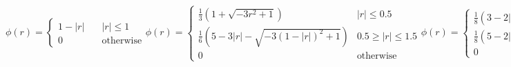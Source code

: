 \begin{subequations}\label{eq:C3_phiFunction}
\begin{equation}\label{eq:C3_phiFunction_2point}
	\phi(r) = 
	\begin{cases}
	1 - |r| \quad &|r| \leq 1 \\
	0	\quad &\text{otherwise}
	\end{cases}
\end{equation}
\begin{equation}\label{eq:C3_phiFunction_3point}
	\phi(r) = 
	\begin{cases}
		\frac{1}{3} \left( 1 + \sqrt{-3r^2 + 1} \right) \quad &|r| \leq 0.5 \\
		\frac{1}{6} \left( 5 - 3|r| - \sqrt{-3(1 - |r|)^2 + 1} \right) & 0.5 \geq |r| \leq 1.5 \\
		0 & \text{otherwise}
	\end{cases}
\end{equation}
\begin{equation}\label{eq:C3_phiFunction_4point}
	\phi(r) = 
	\begin{cases}
		\frac{1}{8}
		\left(
		3 - 2|r| + \sqrt{1 + 4|r| - 4r^2}
		\right) \quad &0 \leq |r| \leq 1
		\\
		\frac{1}{8}
		\left(
		5 - 2|r| + \sqrt{-7 + 12|r| - 4r^2}
		\right) \quad &1 \leq |r| \leq 2
		\\
		0 &\text{otherwise}
	\end{cases}
\end{equation}
\begin{equation}\label{eq:C3_phiFunction_6point}
	\phi(r) = 
	\begin{cases}
		\begin{split}
		\frac{61}{112} - \frac{11}{42} |r| - \frac{11}{56} |r|^2 + \frac{1}{12} |r|^3 + 
		\frac{\sqrt{3}}{336}
		\left( 243 + 1584 |r| \right. \\
		\left. - 748 |r|^2 - 1560 |r|^3 + 500 |r|^4 + 336 |r|^5 - 112 |r|^6
		\right)^{1/2}
		\end{split} \quad & 0 \leq |r| \leq 1
		\\
		\frac{21}{16} + \frac{7}{12} |r| - \frac{7}{8} |r|^2 + \frac{1}{6} |r|^3 - 
		\frac{3}{2} \phi \left( |r| - 1 \right) & 1 \leq |r| \leq 2
		\\
		\frac{9}{8} - \frac{23}{12} |r| + \frac{3}{4} |r|^2 - \frac{1}{12} |r|^3 + 
		\frac{1}{2} \phi \left( |r| - 2 \right) & 2 \leq |r| \leq 3
		\\
		0 & \text{otherwise}
	\end{cases}
\end{equation}
\end{subequations}

